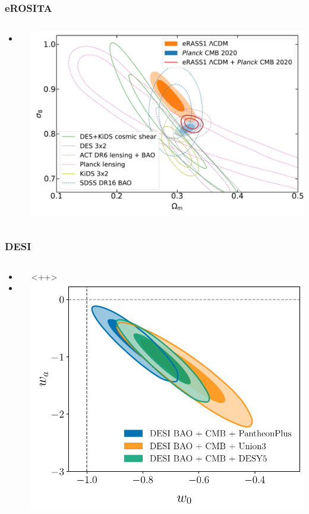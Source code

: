 \documentclass[aspectratio=169]{beamer}
\begin{document}
\begin{frame}
    \frametitle{eROSITA}
    \begin{columns}
        \begin{itemize}
            \item <+Paper+> 
        \end{itemize}
        \includegraphics[width=\textwidth]{figures/eROSITA.pdf}
    \end{columns}
\end{frame}

\begin{frame}
    \frametitle{DESI}
    \begin{columns}
        \begin{itemize}
            \item <+Cosmology+> 
            \item <+Data+> 
        \end{itemize}<++>
        \includegraphics[width=\textwidth]{figures/w0wa_DESI-Planck-SN-95lim.pdf}
    \end{columns}
\end{frame}
\end{document}

